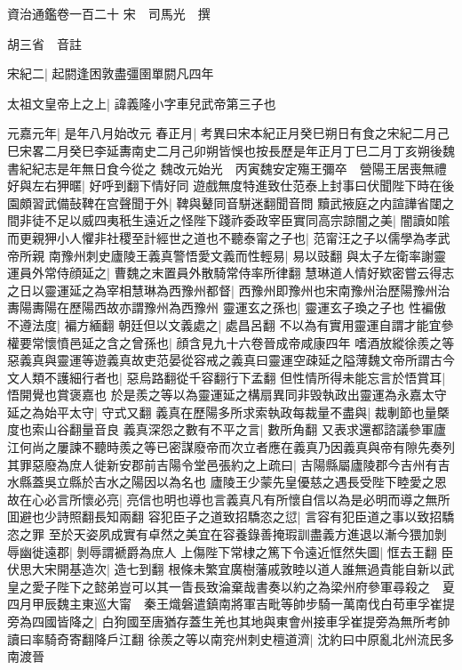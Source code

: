 資治通鑑卷一百二十
宋　司馬光　撰

胡三省　音註

宋紀二|{
	起閼逢困敦盡彊圉單閼凡四年}


太祖文皇帝上之上|{
	諱義隆小字車兒武帝第三子也}


元嘉元年|{
	是年八月始改元}
春正月|{
	考異曰宋本紀正月癸巳朔日有食之宋紀二月己巳宋畧二月癸巳李延夀南史二月己卯朔皆悞也按長歷是年正月丁巳二月丁亥朔後魏書紀紀志是年無日食今從之}
魏改元始光　丙寅魏安定殤王彌卒　營陽王居喪無禮好與左右狎暱|{
	好呼到翻下情好同}
遊戲無度特進致仕范泰上封事曰伏聞陛下時在後園頗習武備鼔鞞在宫聲聞于外|{
	鞞與鼙同音駢迷翻聞音問}
黷武掖庭之内諠譁省闥之間非徒不足以威四夷秖生遠近之怪陛下踐祚委政宰臣實同高宗諒闇之美|{
	闇讀如隂}
而更親狎小人懼非社稷至計經世之道也不聽泰甯之子也|{
	范甯汪之子以儒學為孝武帝所親}
南豫州刺史廬陵王義真警悟愛文義而性輕易|{
	易以豉翻}
與太子左衛率謝靈運員外常侍顔延之|{
	曹魏之末置員外散騎常侍率所律翻}
慧琳道人情好欵密嘗云得志之日以靈運延之為宰相慧琳為西豫州都督|{
	西豫州即豫州也宋南豫州治歷陽豫州治夀陽夀陽在歷陽西故亦謂豫州為西豫州}
靈運玄之孫也|{
	靈運玄子瑍之子也}
性褊傲不遵法度|{
	褊方緬翻}
朝廷但以文義處之|{
	處昌呂翻}
不以為有實用靈運自謂才能宜參權要常懷憤邑延之含之曾孫也|{
	顔含見九十六卷晉成帝咸康四年}
嗜酒放縱徐羨之等惡義真與靈運等遊義真故吏范晏從容戒之義真曰靈運空疎延之隘薄魏文帝所謂古今文人類不護細行者也|{
	惡烏路翻從千容翻行下孟翻}
但性情所得未能忘言於悟賞耳|{
	悟開覺也賞褒嘉也}
於是羨之等以為靈運延之構扇異同非毁執政出靈運為永嘉太守延之為始平太守|{
	守式又翻}
義真在歷陽多所求索執政每裁量不盡與|{
	裁剸節也量槩度也索山谷翻量音良}
義真深怨之數有不平之言|{
	數所角翻}
又表求還都諮議參軍廬江何尚之屢諫不聽時羨之等已密謀廢帝而次立者應在義真乃因義真與帝有隙先奏列其罪惡廢為庶人徙新安郡前吉陽令堂邑張約之上疏曰|{
	吉陽縣屬廬陵郡今吉州有吉水縣蓋吳立縣於吉水之陽因以為名也}
廬陵王少蒙先皇優慈之遇長受陛下睦愛之恩故在心必言所懷必亮|{
	亮信也明也導也言義真凡有所懷自信以為是必明而導之無所囬避也少詩照翻長知兩翻}
容犯臣子之道致招驕恣之愆|{
	言容有犯臣道之事以致招驕恣之罪}
至於天姿夙成實有卓然之美宜在容養錄善掩瑕訓盡義方進退以漸今猥加剝辱幽徙遠郡|{
	剝辱謂褫爵為庶人}
上傷陛下常棣之篤下令遠近恇然失圖|{
	恇去王翻}
臣伏思大宋開基造次|{
	造七到翻}
根條未繁宜廣樹藩戚敦睦以道人誰無過貴能自新以武皇之愛子陛下之懿弟豈可以其一眚長致淪棄哉書奏以約之為梁州府參軍尋殺之　夏四月甲辰魏主東巡大甯　秦王熾磐遣鎮南將軍吉毗等帥步騎一萬南伐白苟車孚崔提旁為四國皆降之|{
	白狗國至唐猶存蓋生羌也其地與東會州接車孚崔提旁為無所考帥讀曰率騎奇寄翻降戶江翻}
徐羨之等以南兖州刺史檀道濟|{
	沈約曰中原亂北州流民多南渡晉}


